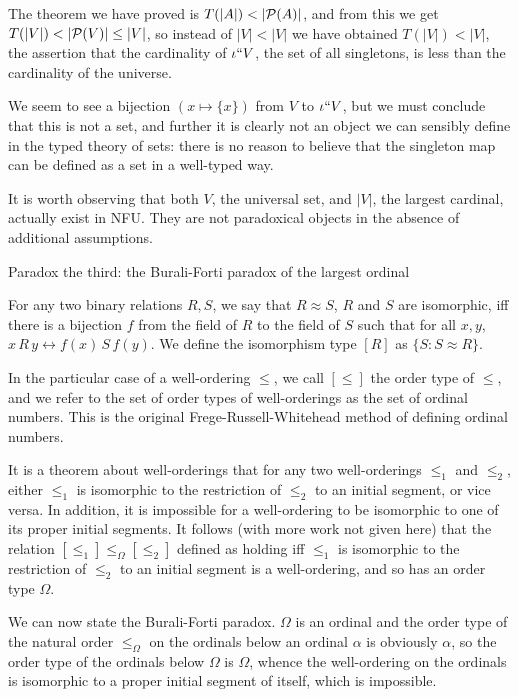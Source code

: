 \documentclass{slides}
\begin{document}
\begin{slide}

The theorem we have proved is $T(|A|) < |{\cal P}(A)|$, and from this we get $T(|V|) < |{\cal P}(V)| \leq |V|$, so instead of $|V|<|V|$ we have obtained
$T(|V|) < |V|$, the assertion that the cardinality of $\iota``V$, the set of all singletons, is less than the cardinality of the universe.

We seem to see a bijection $(x \mapsto \{x\})$ from $V$ to $\iota``V$, but we must conclude that this is not a set, and further it is clearly not
an object we can sensibly define in the typed theory of sets:  there is no reason to believe that the singleton map can be defined as a set in a well-typed way.

It is worth observing that both $V$, the universal set, and $|V|$, the largest cardinal, actually exist in NFU.  They are not paradoxical objects in the absence of additional assumptions.

\end{slide}

\begin{slide}
 {\Large Paradox the third:  the Burali-Forti paradox of the largest ordinal}

For any two binary relations $R,S$, we say that $R \approx S$, $R$ and $S$ are isomorphic, iff there is a bijection $f$ from the field of $R$ to the field of $S$ such 
that for all $x,y$, $x \,R\, y \leftrightarrow f(x) \,S\,f(y)$.  We define the isomorphism type $[R]$ as $\{S:S \approx R\}$.

In the particular case of a well-ordering $\leq$, we call $[\leq]$ the order type of $\leq$, and we refer to the set of order types of well-orderings as the set of ordinal numbers.
This is the original Frege-Russell-Whitehead method of defining ordinal numbers.

\end{slide}

\begin{slide}

It is a theorem about well-orderings that for any two well-orderings $\leq_1$ and $\leq_2$, either $\leq_1$ is isomorphic to the restriction of $\leq_2$ to an initial segment, or vice versa.
In addition, it is impossible for a well-ordering to be isomorphic to one of its proper initial segments.  It follows (with more work not given here) that the relation $[\leq_1] \leq_{\Omega} [\leq_2]$ defined as holding
iff $\leq_1$ is isomorphic to the restriction of $\leq_2$ to an initial segment is a well-ordering, and so has an order type $\Omega$.

We can now state the Burali-Forti paradox.  $\Omega$ is an ordinal and the order type of the natural order $\leq_{\Omega}$  on the ordinals below an ordinal $\alpha$ is obviously $\alpha$, so the order type of the ordinals below $\Omega$ is $\Omega$, whence the well-ordering on the ordinals is isomorphic to a proper initial segment of itself, which is impossible.


\end{slide}
\end{document}
